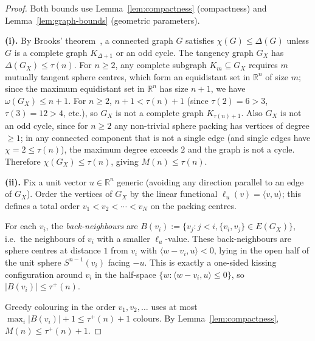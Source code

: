 \begin{proof}
Both bounds use Lemma~\ref{lem:compactness} (compactness) and Lemma~\ref{lem:graph-bounds} (geometric parameters).

\textbf{(i).}  By Brooks' theorem~\cite{Brooks1941}, a connected graph $G$ satisfies $\chi(G)\le \Delta(G)$ unless $G$ is a complete graph $K_{\Delta+1}$ or an odd cycle.  The tangency graph $G_X$ has $\Delta(G_X)\le \tau(n)$.  For $n\ge 2$, any complete subgraph $K_m \subseteq G_X$ requires $m$ mutually tangent sphere centres, which form an equidistant set in $\mathbb{R}^n$ of size $m$; since the maximum equidistant set in $\mathbb{R}^n$ has size $n+1$, we have $\omega(G_X)\le n+1$.  For $n\ge 2$, $n+1 < \tau(n)+1$ (since $\tau(2)=6>3$, $\tau(3)=12>4$, etc.), so $G_X$ is not a complete graph $K_{\tau(n)+1}$.  Also $G_X$ is not an odd cycle, since for $n\ge 2$ any non-trivial sphere packing has vertices of degree $\ge 1$; in any connected component that is not a single edge (and single edges have $\chi=2\le\tau(n)$), the maximum degree exceeds $2$ and the graph is not a cycle.  Therefore $\chi(G_X)\le\tau(n)$, giving $M(n)\le\tau(n)$.

\textbf{(ii).}  Fix a unit vector $u\in\mathbb{R}^n$ generic (avoiding any direction parallel to an edge of $G_X$).  Order the vertices of $G_X$ by the linear functional $\ell_u(v)=\langle v,u\rangle$; this defines a total order $v_1<v_2<\cdots<v_N$ on the packing centres.

For each $v_i$, the \emph{back-neighbours} are $B(v_i):=\{v_j: j<i,\{v_i,v_j\}\in E(G_X)\}$, i.e.\ the neighbours of $v_i$ with a smaller $\ell_u$-value.  These back-neighbours are sphere centres at distance $1$ from $v_i$ with $\langle w-v_i,u\rangle<0$, lying in the open half of the unit sphere $S^{n-1}(v_i)$ facing $-u$.  This is exactly a one-sided kissing configuration around $v_i$ in the half-space $\{w:\langle w-v_i,u\rangle\le 0\}$, so $|B(v_i)|\le\tau^+(n)$.

Greedy colouring in the order $v_1,v_2,\ldots$ uses at most $\max_i|B(v_i)|+1\le\tau^+(n)+1$ colours.  By Lemma~\ref{lem:compactness}, $M(n)\le\tau^+(n)+1$.
\end{proof}

